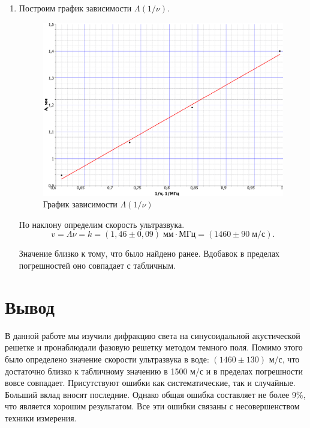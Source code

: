 \documentclass[a4paper,12pt]{article} %
\begin{document}
\begin{enumerate}
		\newpage		
		
		\item Построим график зависимости $\Lambda (1/\nu)$.
		
		\begin{figure}[h!]
			\centering
			\includegraphics[width=0.9\linewidth]{Pictures/Lambda(nu)}
			\caption{График зависимости $\Lambda (1/\nu)$}
		\end{figure}
		
		По наклону определим скорость ультразвука.
		\begin{equation*}
			v = \Lambda \nu = k = (1,46 \pm 0,09) \; \text{мм} \cdot \text{МГц} = (1460 \pm 90 \; \text{м/с}).
		\end{equation*}
	
		Значение близко к тому, что было найдено ранее. Вдобавок в пределах погрешностей оно совпадает с табличным.
	\end{enumerate}

	\vfill
	\section*{Вывод}
	В данной работе мы изучили дифракцию света на синусоидальной акустической решетке и пронаблюдали фазовую решетку методом темного поля. Помимо этого было определено значение скорости ультразвука в воде: $(1460 \pm 130)$ м/с, что достаточно близко к табличному значению в 1500 м/с и в пределах погрешности вовсе совпадает. Присутствуют ошибки как систематические, так и случайные. Больший вклад вносят последние. Однако общая ошибка составляет не более 9$\%$, что является хорошим результатом. Все эти ошибки связаны с несовершенством техники измерения.
	
	
\end{document}
